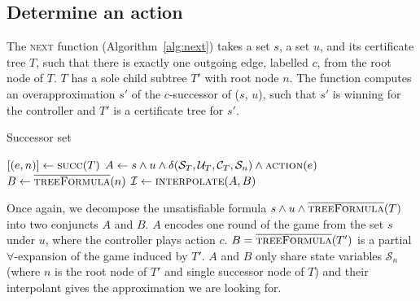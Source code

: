 \subsection{Determine an action}

The \textsc{next} function (Algorithm~\ref{alg:next}) takes a set $s$, a set $u$, and its certificate tree $T$, such that there is exactly one outgoing edge, labelled $c$, from the root node of $T$.  $T$ has a sole child subtree $T'$ with root node $n$.  The function computes an overapproximation $s'$ of the $c$-successor of ($s$, $u$), such that $s'$ is winning for the controller and $T'$ is a certificate tree for $s'$.

\begin{algorithm}
   \caption{Successor set}\label{alg:next}
   \begin{algorithmic}[1]
        \State $[(e, n)] \gets \Call{succ}{T}$ 
            \State $A \gets s \land u \land \delta(\mathcal{S}_T, \mathcal{U}_T, \mathcal{C}_T, \mathcal{S}_{n}) \land \Call{action}{e}$\label{alg:strat:partition:Ai}
            \State $B \gets \textsc{$\overline{\mbox{treeFormula}}$}(n) $\label{alg:strat:partition:Bi}
            \State $\mathcal{I} \gets \Call{interpolate}{A, B}$ \label{alg:strat:partition:I}
            \State {} \label{alg:strat:partition:return}
        \EndFunction
    \end{algorithmic}
\end{algorithm}

Once again, we decompose the unsatisfiable formula $s \land u \land \textsc{$\overline{\mbox{treeFormula}}$}(T)$ into two conjuncts $A$ and $B$.  $A$ encodes one round of the game from the set $s$ under $u$, where the controller plays action $c$.  $B = \textsc{$\overline{\mbox{treeFormula}}$}(T')$ is a partial $\forall$-expansion of the game induced by $T'$.  $A$ and $B$ only share state variables $\mathcal{S}_{n}$ (where $n$ is the root node of $T'$ and single successor node of $T$) and their interpolant gives the approximation we are looking for.


